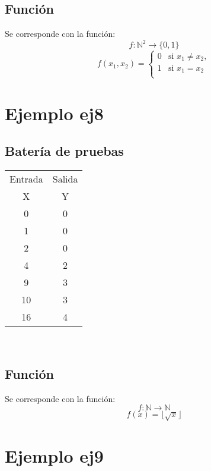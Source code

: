 \documentclass[a4paper]{article}
\begin{document}
  			\subsection{Función}
  				Se corresponde con la función:
  				$$f:\mathbb{N}^2 \longrightarrow \{0, 1\}$$
  				\begin{equation*}
  					f(x_1, x_2) = \left\{
  					\begin{array}{rl}
  					0 & \text{si } x_1 \not =x_2, \\
  					1 & \text{si } x_1= x_2 \\
  					\end{array} \right.
  				\end{equation*}

  		\section{Ejemplo ej8}
  			\subsection{Batería de pruebas}
  			\begin{center}
  				\begin{tabular}{|c|c|} \hline
  					\multicolumn{1}{|l|}{Entrada}&\multicolumn{1}{l|}{Salida}\\
  				X & Y \\
  					\hline
  				0 & 0 \\
  				1 & 0 \\
  				2 & 0 \\
  				4 & 2 \\
  				9 & 3 \\
  				10 & 3 \\
  				16 & 4 \\
  					\hline
  				\end{tabular}\\
  			\end{center}
  			\subsection{Función}
  				Se corresponde con la función:
  				$$f:\mathbb{N} \longrightarrow \mathbb{N}$$
  				\begin{equation*}
  					f(x) = \lfloor \sqrt{x} \rfloor
  				\end{equation*}

  		\section{Ejemplo ej9}
\end{document}
